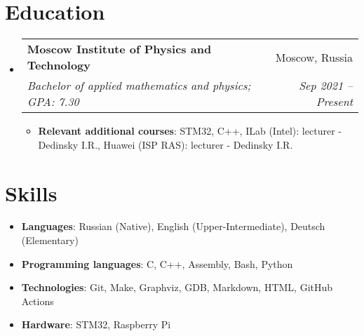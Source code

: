 \documentclass{resume}
\makeatletter
\newcommand{\resumeItem}[2]{
  \item\small{
    \textbf{#1}{: #2 \vspace{-2pt}}
  }
}
\newcommand{\resumeSubheading}[4]{
  \vspace{-1pt}\item
    \begin{tabular*}{0.97\textwidth}[t]{l@{\extracolsep{\fill}}r}
      \textbf{#1} & #2 \\
      \textit{\small#3} & \textit{\small #4} \\
    \end{tabular*}\vspace{-5pt}
}
\newcommand{\resumeSubHeadingListStart}{\begin{itemize}[leftmargin=*]}
\newcommand{\resumeSubHeadingListEnd}{\end{itemize}}
\newcommand{\resumeItemListStart}{\begin{itemize}}
\newcommand{\resumeItemListEnd}{\end{itemize}\vspace{-5pt}}
\makeatother
\begin{document}
\section{Education}
  \resumeSubHeadingListStart
    \resumeSubheading
      {Moscow Institute of Physics and Technology}{Moscow, Russia}
      {Bachelor of applied mathematics and physics;  GPA: 7.30}{Sep 2021 -- Present}
      \resumeItemListStart
      \medskip
      \resumeItem{Relevant additional courses} {STM32, C++, ILab (Intel): lecturer - Dedinsky I.R., Huawei (ISP RAS): lecturer - Dedinsky I.R.}
      \resumeItemListEnd
      
  \resumeSubHeadingListEnd

\section{Skills}
 \resumeSubHeadingListStart
    \item{
    \textbf{Languages}{: Russian (Native), English (Upper-Intermediate), Deutsch (Elementary)}
    }
    \smallskip
   \item{
     \textbf{Programming languages}{: C, C++, Assembly, Bash, Python}
   }
   \smallskip
   \item{\textbf{Technologies}{: Git, Make, Graphviz, GDB, Markdown, HTML, GitHub Actions}
   }
   \smallskip
   \item{\textbf{Hardware}{: STM32, Raspberry Pi}
   }
 \resumeSubHeadingListEnd
\end{document}
